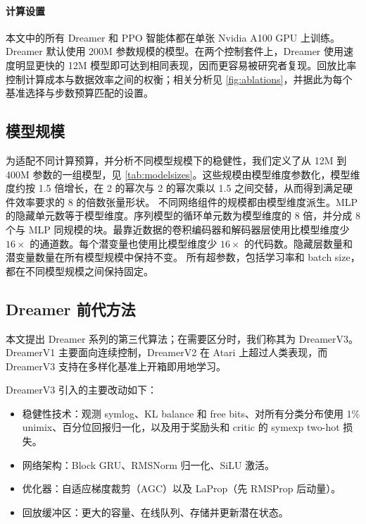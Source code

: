 \paragraph{计算设置}
本文中的所有 Dreamer 和 PPO 智能体都在单张 Nvidia A100 GPU 上训练。Dreamer 默认使用 200M 参数规模的模型。在两个控制套件上，Dreamer 使用速度明显更快的 12M 模型即可达到相同表现，因而更容易被研究者复现。回放比率控制计算成本与数据效率之间的权衡；相关分析见 \cref{fig:ablations}，并据此为每个基准选择与步数预算匹配的设置。

\clearpage

\subsection*{模型规模}

为适配不同计算预算，并分析不同模型规模下的稳健性，我们定义了从 12M 到 400M 参数的一组模型，见 \cref{tab:modelsizes}。这些规模由模型维度参数化，模型维度约按 1.5 倍增长，在 2 的幂次与 2 的幂次乘以 1.5 之间交替，从而得到满足硬件效率要求的 8 的倍数张量形状。
不同网络组件的规模都由模型维度派生。MLP 的隐藏单元数等于模型维度。序列模型的循环单元数为模型维度的 8 倍，并分成 8 个与 MLP 同规模的块。最靠近数据的卷积编码器和解码器层使用比模型维度少 $16\times$ 的通道数。每个潜变量也使用比模型维度少 $16\times$ 的代码数。隐藏层数量和潜变量数量在所有模型规模中保持不变。
所有超参数，包括学习率和 batch size，都在不同模型规模之间保持固定。



\subsection*{Dreamer 前代方法}

本文提出 Dreamer 系列的第三代算法；在需要区分时，我们称其为 DreamerV3。DreamerV1\citep{hafner2019dreamer} 主要面向连续控制，DreamerV2\citep{hafner2020dreamerv2} 在 Atari 上超过人类表现，而 DreamerV3 支持在多样化基准上开箱即用地学习。

DreamerV3 引入的主要改动如下：
\begin{itemize}
\item 稳健性技术：观测 symlog、KL balance 和 free bits、对所有分类分布使用 1\% unimix、百分位回报归一化，以及用于奖励头和 critic 的 symexp two-hot 损失。
\item 网络架构：Block GRU、RMSNorm 归一化、SiLU 激活。
\item 优化器：自适应梯度裁剪（AGC）以及 LaProp（先 RMSProp 后动量）。
\item 回放缓冲区：更大的容量、在线队列、存储并更新潜在状态。
\end{itemize}

